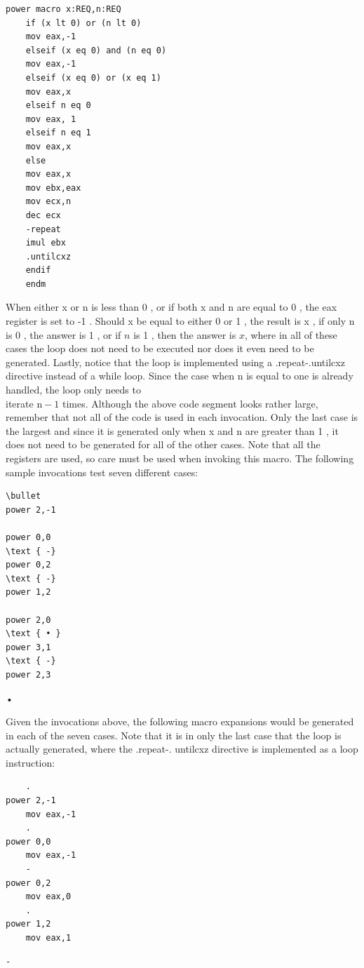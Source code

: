 \documentclass[10pt]{book}
\begin{document}
\begin{verbatim}
power macro x:REQ,n:REQ
    if (x lt 0) or (n lt 0)
    mov eax,-1
    elseif (x eq 0) and (n eq 0)
    mov eax,-1
    elseif (x eq 0) or (x eq 1)
    mov eax,x
    elseif n eq 0
    mov eax, 1
    elseif n eq 1
    mov eax,x
    else
    mov eax,x
    mov ebx,eax
    mov ecx,n
    dec ecx
    -repeat
    imul ebx
    .untilcxz
    endif
    endm
\end{verbatim}

When either x or n is less than 0 , or if both x and n are equal to 0 , the eax register is set to -1 . Should x be equal to either 0 or 1 , the result is x , if only n is 0 , the answer is 1 , or if $n$ is 1 , then the answer is $x$, where in all of these cases the loop does not need to be executed nor does it even need to be generated. Lastly, notice that the loop is implemented using a .repeat-.untilcxz directive instead of a while loop. Since the case when n is equal to one is already handled, the loop only needs to\\
iterate $\mathrm{n}-1$ times. Although the above code segment looks rather large, remember that not all of the code is used in each invocation. Only the last case is the largest and since it is generated only when x and n are greater than 1 , it does not need to be generated for all of the other cases. Note that all the registers are used, so care must be used when invoking this macro. The following sample invocations test seven different cases:


\begin{verbatim}
\bullet
power 2,-1
  
power 0,0
\text { -}
power 0,2
\text { -}
power 1,2
  
power 2,0
\text { • }
power 3,1
\text { -}
power 2,3
\end{verbatim}

•

Given the invocations above, the following macro expansions would be generated in each of the seven cases. Note that it is in only the last case that the loop is actually generated, where the .repeat-. untilcxz directive is implemented as a loop instruction:

\begin{verbatim}
    .
power 2,-1
    mov eax,-1
    .
power 0,0
    mov eax,-1
    -
power 0,2
    mov eax,0
    .
power 1,2
    mov eax,1
\end{verbatim}

\begin{verbatim}
-
\end{verbatim}
\end{document}
